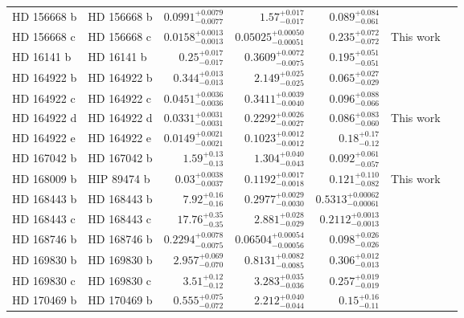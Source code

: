 \begin{longtable*}{llrrrrr}
HD 156668 b & HD 156668 b & $0.0991^{+0.0079}_{-0.0077}$ & $1.57^{+0.017}_{-0.017}$ & $0.089^{+0.084}_{-0.061}$ & \cite{Howard11} & \\
HD 156668 c & HD 156668 c & $0.0158^{+0.0013}_{-0.0013}$ & $0.05025^{+0.00050}_{-0.00051}$ & $0.235^{+0.072}_{-0.072}$ & This work & \\
HD 16141 b & HD 16141 b & $0.25^{+0.017}_{-0.017}$ & $0.3609^{+0.0072}_{-0.0075}$ & $0.195^{+0.051}_{-0.051}$ & \cite{Marcy00} & \\
HD 164922 b & HD 164922 b & $0.344^{+0.013}_{-0.013}$ & $2.149^{+0.025}_{-0.025}$ & $0.065^{+0.027}_{-0.029}$ & \cite{Butler06} & \\
HD 164922 c & HD 164922 c & $0.0451^{+0.0036}_{-0.0036}$ & $0.3411^{+0.0039}_{-0.0040}$ & $0.096^{+0.088}_{-0.066}$ & \cite{Fulton16} & \\
HD 164922 d & HD 164922 d & $0.0331^{+0.0031}_{-0.0031}$ & $0.2292^{+0.0026}_{-0.0027}$ & $0.086^{+0.083}_{-0.060}$ & This work & \\
HD 164922 e & HD 164922 e & $0.0149^{+0.0021}_{-0.0021}$ & $0.1023^{+0.0012}_{-0.0012}$ & $0.18^{+0.17}_{-0.12}$ & \cite{Benatti20} & \\
HD 167042 b & HD 167042 b & $1.59^{+0.13}_{-0.13}$ & $1.304^{+0.040}_{-0.043}$ & $0.092^{+0.061}_{-0.057}$ & \cite{Johnson08} & \\
HD 168009 b & HIP 89474 b & $0.03^{+0.0038}_{-0.0037}$ & $0.1192^{+0.0017}_{-0.0018}$ & $0.121^{+0.110}_{-0.082}$ & This work & \\
HD 168443 b & HD 168443 b & $7.92^{+0.16}_{-0.16}$ & $0.2977^{+0.0029}_{-0.0030}$ & $0.5313^{+0.00062}_{-0.00061}$ & \cite{Marcy99} & \\
HD 168443 c & HD 168443 c & $17.76^{+0.35}_{-0.35}$ & $2.881^{+0.028}_{-0.029}$ & $0.2112^{+0.0013}_{-0.0013}$ & \cite{Marcy01} & \\
HD 168746 b & HD 168746 b & $0.2294^{+0.0078}_{-0.0075}$ & $0.06504^{+0.00054}_{-0.00056}$ & $0.098^{+0.026}_{-0.026}$ & \cite{Pepe02} & \\
HD 169830 b & HD 169830 b & $2.957^{+0.069}_{-0.070}$ & $0.8131^{+0.0082}_{-0.0085}$ & $0.306^{+0.012}_{-0.013}$ & \cite{Naef01} & \\
HD 169830 c & HD 169830 c & $3.51^{+0.12}_{-0.12}$ & $3.283^{+0.035}_{-0.036}$ & $0.257^{+0.019}_{-0.019}$ & \cite{Mayor04} & \\
HD 170469 b & HD 170469 b & $0.555^{+0.075}_{-0.072}$ & $2.212^{+0.040}_{-0.044}$ & $0.15^{+0.16}_{-0.11}$ & \cite{Fischer07} & \\

\end{longtable*}
